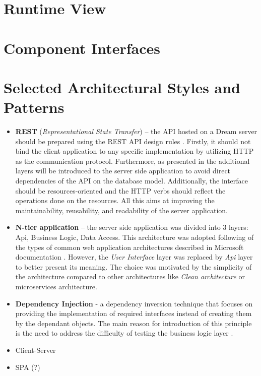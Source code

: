 \section{Runtime View}

\section{Component Interfaces}

\section{Selected Architectural Styles and Patterns}
\begin{itemize}
    \item \textbf{REST} (\textit{Representational State Transfer}) – the API hosted on a Dream server should be prepared using the REST API design rules \cite{rest} \cite{rest-microsoft}. Firstly, it should not bind the client application to any specific implementation by utilizing HTTP as the communication protocol. Furthermore, as presented in the  additional layers will be introduced to the server side application to avoid direct dependencies of the API on the database model. Additionally, the interface should be resources-oriented and the HTTP verbs should reflect the operations done on the resources. All this aims at improving the maintainability, reusability, and readability of the server application.
    \item \textbf{N-tier application} – the server side application was divided into 3 layers: Api, Business Logic, Data Access. This architecture was adopted following of the types of common web application architectures described in Microsoft documentation \cite{ntier}. However, the \textit{User Interface} layer was replaced by \textit{Api} layer to better present its meaning. The choice was motivated by the simplicity of the architecture compared to other architectures like \textit{Clean architecture} or microservices architecture. 
    \item \textbf{Dependency Injection} - a dependency inversion technique that focuses on providing the implementation of required interfaces instead of creating them by the dependant objects. The main reason for introduction of this principle is the need to address the difficulty of testing the business logic layer \cites{ntier} \cite{di}. 
    \item Client-Server
    \item SPA (?)
\end{itemize}

